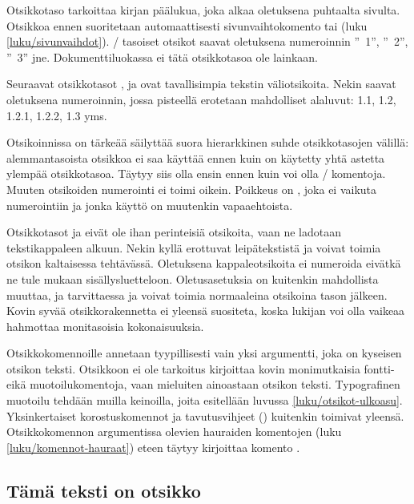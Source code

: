 Otsikkotaso  tarkoittaa kirjan päälukua, joka alkaa
oletuksena puhtaalta sivulta. Otsikkoa ennen suoritetaan automaattisesti
sivunvaihtokomento  tai 
(luku \ref{luku/sivunvaihdot}). \-/ tasoiset otsikot
saavat oletuksena numeroinnin ''\chaptername~1'', ''\chaptername~2'',
''\chaptername~3'' jne. Dokumenttiluokassa  ei tätä
otsikkotasoa ole lainkaan.

Seuraavat otsikkotasot ,  ja
 ovat tavallisimpia tekstin väliotsikoita. Nekin
saavat oletuksena numeroinnin, jossa pisteellä erotetaan mahdolliset
alaluvut: 1.1, 1.2, 1.2.1, 1.2.2, 1.3 yms.

Otsikoinnissa on tärkeää säilyttää suora hierarkkinen suhde
otsikkotasojen välillä: alemmantasoista otsikkoa ei saa käyttää ennen
kuin on käytetty yhtä astetta ylempää otsikkotasoa. Täytyy siis olla
ensin  ennen kuin voi olla \-/
komentoja. Muuten otsikoiden numerointi ei toimi oikein. Poikkeus on
, joka ei vaikuta numerointiin ja jonka käyttö on
muutenkin vapaaehtoista.

Otsikkotasot  ja  eivät ole
ihan perinteisiä otsikoita, vaan ne ladotaan tekstikappaleen alkuun.
Nekin kyllä erottuvat leipätekstistä ja voivat toimia otsikon
kaltaisessa tehtävässä. Oletuksena kappaleotsikoita ei numeroida eivätkä
ne tule mukaan sisällysluetteloon. Oletusasetuksia on kuitenkin
mahdollista muuttaa, ja tarvittaessa  ja
 voivat toimia normaaleina otsikoina tason
 jälkeen. Kovin syvää otsikkorakennetta ei
yleensä suositeta, koska lukijan voi olla vaikeaa hahmottaa monitasoisia
kokonaisuuksia.

Otsikkokomennoille annetaan tyypillisesti vain yksi argumentti, joka on
kyseisen otsikon teksti. Otsikkoon ei ole tarkoitus kirjoittaa kovin
monimutkaisia fontti- eikä muotoilukomentoja, vaan mieluiten ainoastaan
otsikon teksti. Typografinen muotoilu tehdään muilla keinoilla, joita
esitellään luvussa \ref{luku/otsikot-ulkoasu}. Yksinkertaiset
korostuskomennot ja tavutusvihjeet (\komento{-}) kuitenkin toimivat
yleensä. Otsikkokomennon argumentissa olevien hauraiden komentojen (luku
\ref{luku/komennot-hauraat}) eteen täytyy kirjoittaa komento
.

\begin{koodilohkosis}
\section{Tämä teksti on otsikko}
\end{koodilohkosis}

